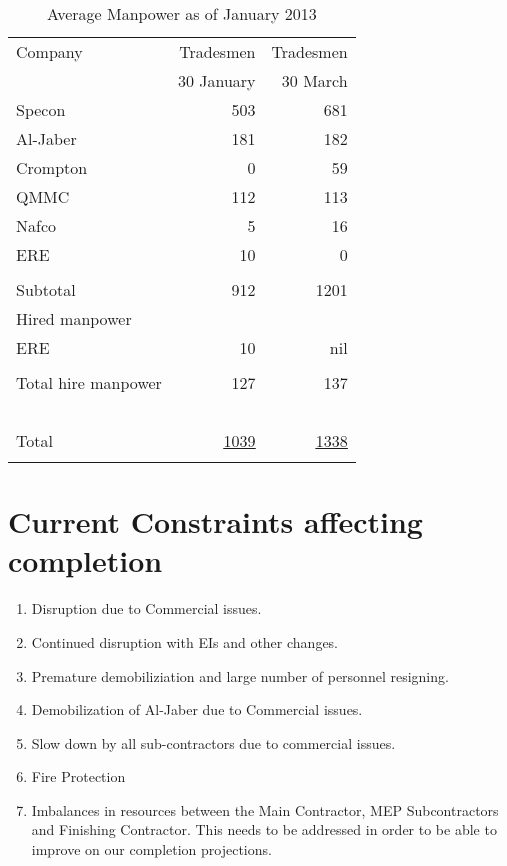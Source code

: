 \def\Z{\phantom{Z}}
\begin{table}[htbp]
\begin{center}
\begin{tabular}{l r r}
\toprule
Company           &Tradesmen   & Tradesmen\\
~                 &30 January  & 30 March \\
\midrule
Specon            &503         & 681\\
Al-Jaber          &181         &182\\
Crompton          &0           &59\\
QMMC              &112         &113\\
Nafco             &5           &16\\
ERE               &10          & 0\\
                  &\underline{\phantom{1075}}
                  &\underline{\phantom{1075}}\\
Subtotal          &912         &1201\\

Hired manpower    &            &\\
\Z ERE            &10          & nil\\

                  & \underline{\phantom{1075}}
                  & \underline{\phantom{1075}}\\
\Z Total hire manpower &127     &137\\
~&&\\
Total                      & \underline{\underline{1039}}       &\underline{\underline{1338}}\\
                             & &\\
\bottomrule
\end{tabular}
\caption{Average Manpower as of January 2013}
\label{personnel}
\end{center}
\end{table}



\section*{Current Constraints affecting completion}

\begin{enumerate}
\item Disruption due to Commercial issues.
\item Continued disruption with EIs and other changes.
\item Premature demobiliziation and large number of personnel resigning.
\item Demobilization of Al-Jaber due to Commercial issues.
\item Slow down by all sub-contractors due to commercial issues.
\item Fire Protection
\item Imbalances in resources between the Main Contractor, MEP Subcontractors and Finishing Contractor. This needs to be addressed in order to be able to improve on our completion projections.
\end{enumerate}

